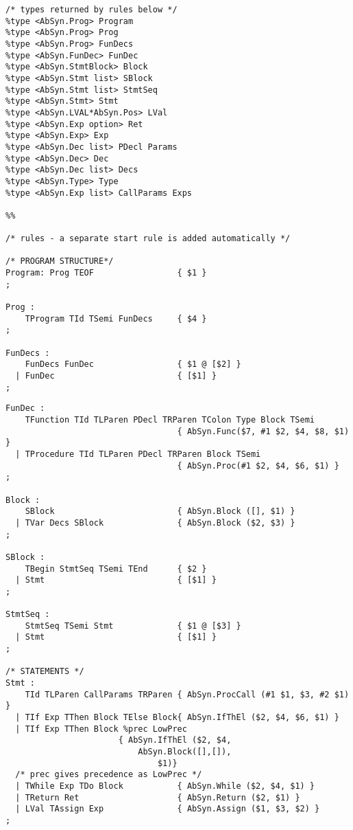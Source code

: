 \documentclass[12pt,a4paper,english]{article}
\begin{document}
\begin{lstlisting}[caption=The types and some of the grammar for the Parser.grm. (continued from listing 1)]
/* types returned by rules below */
%type <AbSyn.Prog> Program
%type <AbSyn.Prog> Prog
%type <AbSyn.Prog> FunDecs
%type <AbSyn.FunDec> FunDec
%type <AbSyn.StmtBlock> Block 
%type <AbSyn.Stmt list> SBlock
%type <AbSyn.Stmt list> StmtSeq
%type <AbSyn.Stmt> Stmt
%type <AbSyn.LVAL*AbSyn.Pos> LVal
%type <AbSyn.Exp option> Ret
%type <AbSyn.Exp> Exp
%type <AbSyn.Dec list> PDecl Params
%type <AbSyn.Dec> Dec
%type <AbSyn.Dec list> Decs
%type <AbSyn.Type> Type
%type <AbSyn.Exp list> CallParams Exps

%%

/* rules - a separate start rule is added automatically */

/* PROGRAM STRUCTURE*/
Program: Prog TEOF                 { $1 } 
;

Prog : 
    TProgram TId TSemi FunDecs     { $4 }
;

FunDecs :
    FunDecs FunDec                 { $1 @ [$2] }
  | FunDec                         { [$1] }
;
\end{lstlisting}
\newpage
\begin{lstlisting}[caption=More of the grammar for our Parser.grm. (continued from listing 2)]
FunDec :
    TFunction TId TLParen PDecl TRParen TColon Type Block TSemi
                                   { AbSyn.Func($7, #1 $2, $4, $8, $1) }
  | TProcedure TId TLParen PDecl TRParen Block TSemi
                                   { AbSyn.Proc(#1 $2, $4, $6, $1) }
;

Block :
    SBlock                         { AbSyn.Block ([], $1) }
  | TVar Decs SBlock               { AbSyn.Block ($2, $3) }
;

SBlock :
    TBegin StmtSeq TSemi TEnd      { $2 }
  | Stmt                           { [$1] }
;

StmtSeq :
    StmtSeq TSemi Stmt             { $1 @ [$3] }
  | Stmt                           { [$1] }
;

/* STATEMENTS */
Stmt :
    TId TLParen CallParams TRParen { AbSyn.ProcCall (#1 $1, $3, #2 $1) }
  | TIf Exp TThen Block TElse Block{ AbSyn.IfThEl ($2, $4, $6, $1) }
  | TIf Exp TThen Block %prec LowPrec 
			           { AbSyn.IfThEl ($2, $4, 
						   AbSyn.Block([],[]), 
					    	   $1)}
  /* prec gives precedence as LowPrec */
  | TWhile Exp TDo Block           { AbSyn.While ($2, $4, $1) }
  | TReturn Ret                    { AbSyn.Return ($2, $1) }
  | LVal TAssign Exp               { AbSyn.Assign ($1, $3, $2) }
;
\end{lstlisting}
\end{document}
